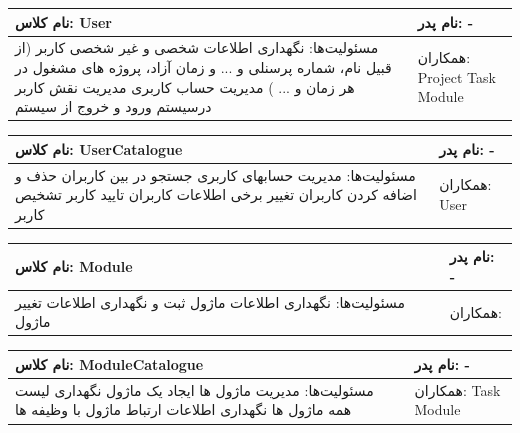 \documentclass{article}
\begin{document}
\vspace{1cm}
\begin{tabular}{|p{6cm}|p{6cm}|}
\hline
نام کلاس: User
&
نام پدر: -
\\
\hline
مسئولیت‌ها:
\newline
نگهداری اطلاعات شخصی و غیر شخصی کاربر (از قبیل نام، شماره پرسنلی و ... و زمان آزاد، پروژه های مشغول در هر زمان و ... )
\newline
مدیریت حساب کاربری
\newline
مدیریت نقش کاربر درسیستم
\newline
ورود و خروج از سیستم
&
همکاران:
\newline
Project
\newline
Task
\newline
Module
\\
\hline
\end{tabular}

\vspace{1cm}
\begin{tabular}{|p{6cm}|p{6cm}|}
\hline
نام کلاس: UserCatalogue
&
نام پدر: -
\\
\hline
مسئولیت‌ها:
\newline
مدیریت حسابهای کاربری
\newline
جستجو در بین کاربران
\newline
حذف و اضافه کردن کاربران
\newline
تغییر برخی اطلاعات کاربران
\newline
تایید کاربر
\newline
تشخیص کاربر
&
همکاران:
\newline
User
\\
\hline
\end{tabular}
\vspace{1cm}

\begin{tabular}{|p{6cm}|p{6cm}|}
\hline
نام کلاس: Module
&
نام پدر: -
\\
\hline
مسئولیت‌ها:
\newline
نگهداری اطلاعات ماژول
\newline
ثبت و نگهداری اطلاعات تغییر ماژول
&
همکاران:
\\
\hline
\end{tabular}
\vspace{1cm}

\begin{tabular}{|p{6cm}|p{6cm}|}
\hline
نام کلاس: ModuleCatalogue
&
نام پدر: -
\\
\hline
مسئولیت‌ها:
\newline
مدیریت ماژول ها
\newline
ایجاد یک ماژول
\newline
نگهداری لیست همه ماژول ها
\newline
نگهداری اطلاعات ارتباط ماژول با وظیفه ها
&
همکاران:
\newline
Task
\newline
Module
\\
\hline
\end{tabular}
\vspace{1cm}
\end{document}
